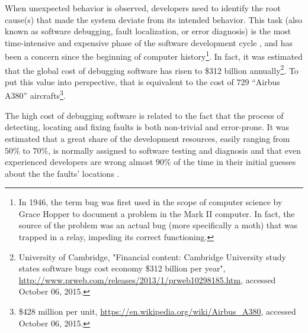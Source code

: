 When unexpected behavior is observed, developers need to identify the
root cause(s) that made the system deviate from its intended behavior.
%
This task (also known as software debugging, fault localization, or
error diagnosis) is the most time-intensive and expensive phase of the
software development cycle \citep{Hailpern02}, and has been a concern
since the beginning of computer history\footnote{In 1946, the term bug
  was first used in the scope of computer science by Grace Hopper to
  document a problem in the Mark II computer.  In fact, the source of
  the problem was an actual bug (more specifically a moth) that was
  trapped in a relay, impeding its correct functioning.}.
%
In fact, it was estimated that the global cost of debugging software
has risen to \$312 billion annually\footnote{ University of
  Cambridge, "Financial content: Cambridge University study states
  software bugs cost economy \$312 billion per year",
  \url{http://www.prweb.com/releases/2013/1/prweb10298185.htm},
  accessed October 06, 2015.}.
%
To put this value into perspective, that is equivalent to the cost of
$729$ ``Airbus A380'' aircrafts\footnote{\$428 million per unit,
  \url{https://en.wikipedia.org/wiki/Airbus_A380}, accessed October
  06, 2015.}.

The high cost of debugging software is related to the fact that the
process of detecting, locating and fixing faults is both non-trivial
and error-prone.
%
It was estimated that a great share of the development resources,
easily ranging from $50\%$ to $70\%$, is normally assigned to software
testing and diagnosis \citep{Hailpern02} and that even experienced
developers are wrong almost $90\%$ of the time in their initial
guesses about the the faults' locations \citep{Ko08}.


